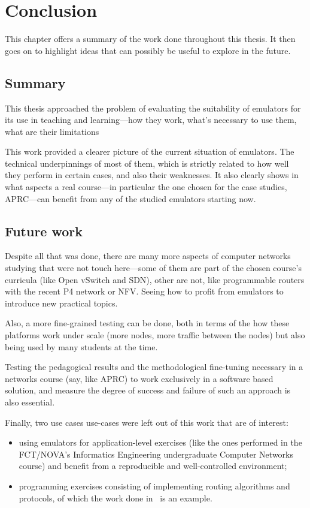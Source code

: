 
\chapter{Conclusion}
\label{ch:conclusion}

This chapter offers a summary of the work done throughout this thesis.
It then goes on to highlight ideas that can possibly be useful to explore in the future.

\section{Summary}

This thesis approached the problem of evaluating the suitability of emulators for its use in teaching and learning---how they work, what's necessary to use them, what are their limitations\textellipsis

This work provided a clearer picture of the current situation of emulators.
The technical underpinnings of most of them, which is strictly related to how well they perform in certain cases, and also their weaknesses.
It also clearly shows in what aspects a real course---in particular the one chosen for the case studies, APRC---can benefit from any of the studied emulators starting now.

\section{Future work}

Despite all that was done, there are many more aspects of computer networks studying that were not touch here---some of them are part of the chosen course's curricula (like Open vSwitch and SDN), other are not, like programmable routers with the recent P4 network or NFV.
Seeing how to profit from emulators to introduce new practical topics.

Also, a more fine-grained testing can be done, both in terms of the how these platforms work under scale (more nodes, more traffic between the nodes) but also being used by many students at the time.

Testing the pedagogical results and the methodological fine-tuning necessary in a networks course (say, like APRC) to work exclusively in a software based solution, and measure the degree of success and failure of such an approach is also essential.

Finally, two use cases use-cases were left out of this work that are of interest:
\begin{itemize}
  \item using emulators for application-level exercises (like the ones performed in the FCT/NOVA's Informatics Engineering undergraduate Computer Networks course) and benefit from a reproducible and well-controlled environment;
  \item programming exercises consisting of implementing routing algorithms and protocols, of which the work done in~\cite{teachandlearnmininet} is an example.
\end{itemize}

